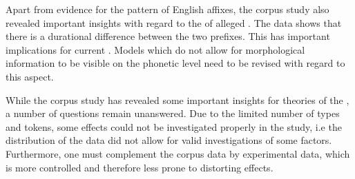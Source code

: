 Apart from evidence for the  pattern of English affixes, the corpus study also revealed important insights with regard to the  of alleged . The data shows that there is a durational difference between the two prefixes. This has important implications for current . Models which do not allow for morphological information to be visible on the phonetic level need to be revised with regard to this aspect.



While the corpus study has revealed some important insights for theories of the , a number of questions remain  unanswered. Due to the limited number of types and tokens, some effects could not be investigated properly in the study, i.e the distribution of the data did not allow for valid investigations of some factors. Furthermore, one must complement the corpus data by experimental data, which is more controlled and therefore less prone to distorting effects.
